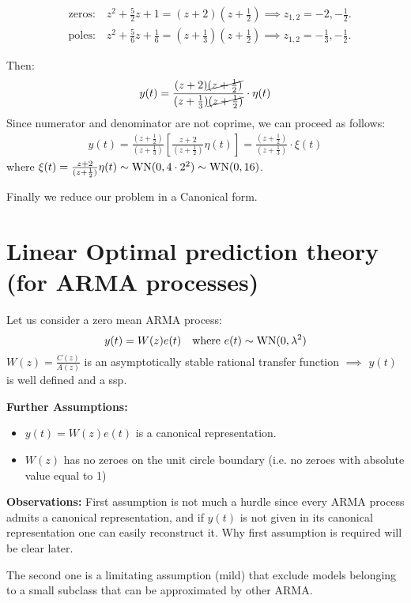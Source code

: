 \begin{align*}
	&\text{zeros:}\quad z^2+\frac{5}{2}z+1=(z+2)(z+\frac{1}{2}) \implies z_{1,2}=-2,-\frac{1}{2}.\\
	&\text{poles:}\quad z^2+\frac{5}{6}z+\frac{1}{6}=(z+\frac{1}{3})(z+\frac{1}{2}) \implies z_{1,2}=-\frac{1}{3},-\frac{1}{2}.
\end{align*}



Then:
\begin{align*}
	y(t)=\frac{(z+2)\cancel{(z+\frac{1}{2})}}{(z+\frac{1}{3})\cancel{(z+\frac{1}{2})}}\cdot \eta(t) 
\end{align*}
Since numerator and denominator are not coprime, we can proceed as follows:
\begin{align*}
	y(t)=\frac{(z+\frac{1}{2})}{(z+\frac{1}{3})}\left[\frac{z+2}{(z+\frac{1}{2})}\eta(t)\right]=\frac{(z+\frac{1}{2})}{(z+\frac{1}{3})}\cdot \xi(t)
\end{align*}
where $\xi(t)=\frac{z+2}{(z+\frac{1}{2})}\eta(t)\sim \operatorname{WN}(0,4\cdot2^2)\sim \operatorname{WN}(0,16)$.

Finally we reduce our problem in a Canonical form.
\section{Linear Optimal prediction theory (for ARMA processes) }
Let us consider a zero mean ARMA process:
\[
	y(t)=W(z)e(t) \quad \text{where }e(t)\sim \operatorname{WN}(0,\lambda^{2} )
\]
$W(z)=\frac{C(z)}{A(z)}$ is an asymptotically stable rational transfer function $\implies$ $y(t)$ is well defined and a \gls{ssp}.

\textbf{Further Assumptions:}
\begin{itemize}
	\item $y(t) =W(z)e(t)$ is a canonical representation.
	\item $W(z)$ has no zeroes on the unit circle boundary (i.e. no zeroes with absolute value equal to 1)
\end{itemize}
 
\textbf{Observations:}
First assumption is not much a hurdle since every ARMA process admits a canonical representation, and if $y(t)$ is not given in its canonical representation one can easily reconstruct it. Why first assumption is required will be clear later. 

The second one is a limitating assumption (mild) that exclude models belonging to a small subclass that can be approximated by other ARMA.

